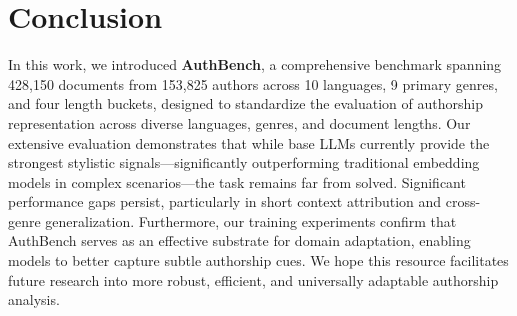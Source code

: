 \documentclass{article}
\newcommand{\rededit}[1]{{\color{editred}#1}}
\begin{document}


\section{Conclusion}
In this work, we introduced \textbf{AuthBench}, \rededit{a comprehensive benchmark spanning 428{,}150 documents from 153{,}825 authors across 10 languages, 9 primary genres, and four length buckets,} designed to standardize the evaluation of authorship representation across diverse languages, genres, and document lengths. Our extensive evaluation demonstrates that while base LLMs currently provide the strongest stylistic signals—significantly outperforming traditional embedding models in complex scenarios—the task remains far from solved. Significant performance gaps persist, particularly in short context attribution and cross-genre generalization. Furthermore, our training experiments confirm that AuthBench serves as an effective substrate for domain adaptation, enabling models to better capture subtle authorship cues. We hope this resource facilitates future research into more robust, efficient, and universally adaptable authorship analysis.
\end{document}
